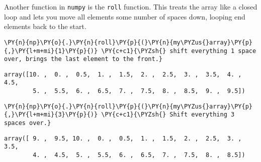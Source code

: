     Another function in \texttt{numpy} is the \texttt{roll} function. This
treats the array like a closed loop and lets you move all elements some
number of spaces down, looping end elements back to the start.

    \begin{tcolorbox}[breakable, size=fbox, boxrule=1pt, pad at break*=1mm,colback=cellbackground, colframe=cellborder]
\begin{Verbatim}[commandchars=\\\{\}]
\PY{n}{np}\PY{o}{.}\PY{n}{roll}\PY{p}{(}\PY{n}{my\PYZus{}array}\PY{p}{,}\PY{l+m+mi}{1}\PY{p}{)} \PY{c+c1}{\PYZsh{} shift everything 1 space over, brings the last element to the front.}
\end{Verbatim}
\end{tcolorbox}

            \begin{tcolorbox}[breakable, size=fbox, boxrule=.5pt, pad at break*=1mm, opacityfill=0]
\begin{Verbatim}[commandchars=\\\{\}]
array([10. ,  0. ,  0.5,  1. ,  1.5,  2. ,  2.5,  3. ,  3.5,  4. ,  4.5,
        5. ,  5.5,  6. ,  6.5,  7. ,  7.5,  8. ,  8.5,  9. ,  9.5])
\end{Verbatim}
\end{tcolorbox}
        
    \begin{tcolorbox}[breakable, size=fbox, boxrule=1pt, pad at break*=1mm,colback=cellbackground, colframe=cellborder]
\begin{Verbatim}[commandchars=\\\{\}]
\PY{n}{np}\PY{o}{.}\PY{n}{roll}\PY{p}{(}\PY{n}{my\PYZus{}array}\PY{p}{,}\PY{l+m+mi}{3}\PY{p}{)} \PY{c+c1}{\PYZsh{} Shift everything 3 spaces over.}
\end{Verbatim}
\end{tcolorbox}

            \begin{tcolorbox}[breakable, size=fbox, boxrule=.5pt, pad at break*=1mm, opacityfill=0]
\begin{Verbatim}[commandchars=\\\{\}]
array([ 9. ,  9.5, 10. ,  0. ,  0.5,  1. ,  1.5,  2. ,  2.5,  3. ,  3.5,
        4. ,  4.5,  5. ,  5.5,  6. ,  6.5,  7. ,  7.5,  8. ,  8.5])
\end{Verbatim}
\end{tcolorbox}
        
